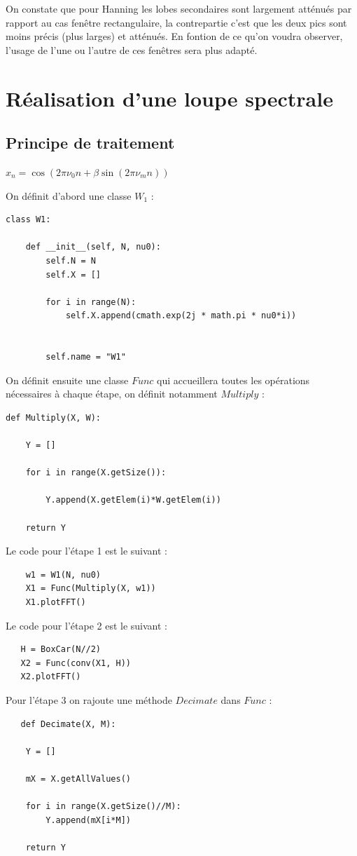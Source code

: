 \documentclass{article}
\begin{document}
On constate que pour Hanning les lobes secondaires sont largement atténués par rapport au cas fenêtre rectangulaire, la contrepartie c'est que les deux pics sont moins précis (plus larges) et atténués. En fontion de ce qu'on voudra observer, l'usage de l'une ou l'autre de ces fenêtres sera plus adapté.

\section{Réalisation d'une loupe spectrale}
\subsection{Principe de traitement}
$x_{n}=\cos(2\pi\nu_{0}n+\beta\sin(2\pi\nu_{m}n))$

On définit d'abord une classe $W_{1}$ :

\begin{lstlisting}
class W1:

    def __init__(self, N, nu0):
        self.N = N
        self.X = []

        for i in range(N):
            self.X.append(cmath.exp(2j * math.pi * nu0*i))


        self.name = "W1"
\end{lstlisting}

On définit ensuite une classe $Func$ qui accueillera toutes les opérations nécessaires à chaque étape, on  définit notamment $Multiply$ : 

\begin{lstlisting}
def Multiply(X, W):

    Y = []

    for i in range(X.getSize()):

        Y.append(X.getElem(i)*W.getElem(i))

    return Y
\end{lstlisting}

Le code pour l'étape 1 est le suivant :
\begin{lstlisting}
    w1 = W1(N, nu0)
    X1 = Func(Multiply(X, w1))
    X1.plotFFT()
\end{lstlisting}

Le code pour l'étape 2 est le suivant :
\begin{lstlisting}
   H = BoxCar(N//2)
   X2 = Func(conv(X1, H))
   X2.plotFFT()
\end{lstlisting}

Pour l'étape 3 on rajoute une méthode $Decimate$ dans $Func$ :
\begin{lstlisting}
   def Decimate(X, M):

    Y = []

    mX = X.getAllValues()

    for i in range(X.getSize()//M):
        Y.append(mX[i*M])

    return Y
\end{lstlisting}
\end{document}
